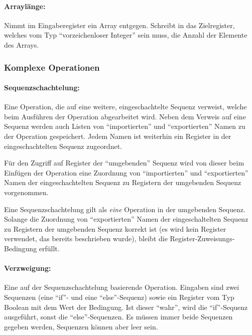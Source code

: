 \documentclass[twoside,a4paper,fleqn,12pt]{book}
\begin{document}
\paragraph{Arraylänge:} Nimmt im Eingaberegister ein Array entgegen. Schreibt in das Zielregister, welches vom Typ "`vorzeichenloser Integer"' sein muss,
die Anzahl der Elemente des Arrays.

\subsubsection{Komplexe Operationen}

\paragraph{Sequenzschachtelung:} Eine Operation, die auf eine weitere, eingeschachtelte Sequenz verweist, welche beim Ausführen der Operation abgearbeitet wird.
Neben dem Verweis auf eine Sequenz werden auch Listen von "`importierten"' und "`exportierten"' Namen zu der Operation gespeichert.
Jedem Namen ist weiterhin ein Register in der eingeschachtelten Sequenz zugeordnet.

Für den Zugriff auf Register der "`umgebenden"' Sequenz wird von dieser 
beim Einfügen der Operation eine Zuordnung von "`importierten"' und "`exportierten"' Namen der
eingeschachtelten Sequenz zu Registern der umgebenden Sequenz vorgenommen. 

Eine Sequenzschachtelung gilt als \emph{eine} Operation in der umgebenden Sequenz. Solange die Zuordnung von "`exportierten"' Namen der
eingeschaltelten Sequenz zu Registern der umgebenden Sequenz korrekt ist (es wird kein Register verwendet, das bereits beschrieben wurde), bleibt die Register-Zuweisungs-Bedingung erfüllt.

\paragraph{Verzweigung:} Eine auf der Sequenzschachtelung basierende Operation. Eingaben sind zwei Sequenzen (eine ``if''- und eine ``else''-Sequenz) sowie ein Register vom
Typ Boolean mit dem Wert der Bedingung. Ist dieser "`wahr"', wird die ``if''-Sequenz ausgeführt, sonst die ``else''-Sequenzen. Es müssen immer beide Sequenzen
gegeben werden, Sequenzen können aber leer sein.
\end{document}
